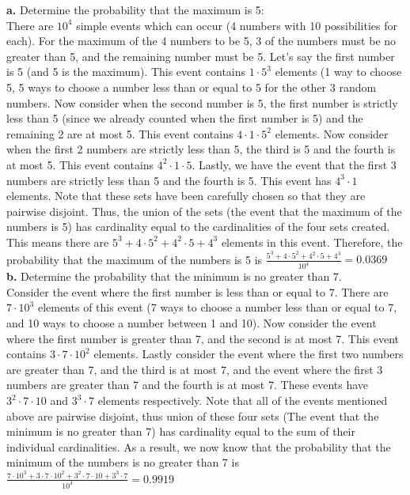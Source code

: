 \documentclass{scrartcl}
\begin{document}
\textbf{a.} Determine the probability that the maximum is 5:\\
There are $10^4$ simple events which can occur (4 numbers with 10 possibilities for each). For the maximum of the 4 numbers to be 5, 3 of the numbers must be no greater than 5, and the remaining number must be 5. Let's say the first number is 5 (and 5 is the maximum). This event contains $1\cdot5^3$ elements (1 way to choose 5, 5 ways to choose a number less than or equal to 5 for the other 3 random numbers. Now consider when the second number is 5, the first number is strictly less than 5 (since we already counted when the first number is 5) and the remaining 2 are at most 5. This event contains $4\cdot1\cdot5^2$ elements. Now consider when the first 2 numbers are strictly less than 5, the third is 5 and the fourth is at most 5. This event contains $4^2\cdot1\cdot5$. Lastly, we have the event that the first 3 numbers are strictly less than 5 and the fourth is 5. This event has $4^3\cdot1$ elements. Note that these sets have been carefully chosen so that they are pairwise disjoint. Thus, the union of the sets (the event that the maximum of the numbers is 5) has cardinality equal to the cardinalities of the four sets created. This means there are $5^3+4\cdot5^2+4^2\cdot5+4^3$ elements in this event. Therefore, the probability that the maximum of the numbers is 5 is $\frac{5^3+4\cdot5^2+4^2\cdot5+4^3}{10^4}=0.0369$\\

\textbf{b.} Determine the probability that the minimum is no greater than 7.\\
Consider the event where the first number is less than or equal to 7. There are $7\cdot10^3$ elements of this event (7 ways to choose a number less than or equal to 7, and 10 ways to choose a number between 1 and 10). Now consider the event where the first number is greater than 7, and the second is at most 7. This event contains $3\cdot7\cdot10^2$ elements. Lastly consider the event where the first two numbers are greater than 7, and the third is at most 7, and the event where the first 3 numbers are greater than 7 and the fourth is at most 7. These events have $3^2\cdot7\cdot10$ and $3^3\cdot7$ elements respectively. Note that all of the events mentioned above are pairwise disjoint, thus union of these four sets (The event that the minimum is no greater than 7) has cardinality equal to the sum of their individual cardinalities. As a result, we now know that the probability that the minimum of the numbers is no greater than 7 is $\frac{7\cdot10^3+3\cdot7\cdot10^2+3^2\cdot7\cdot10+3^3\cdot7}{10^4}=0.9919$\\
\end{document}
